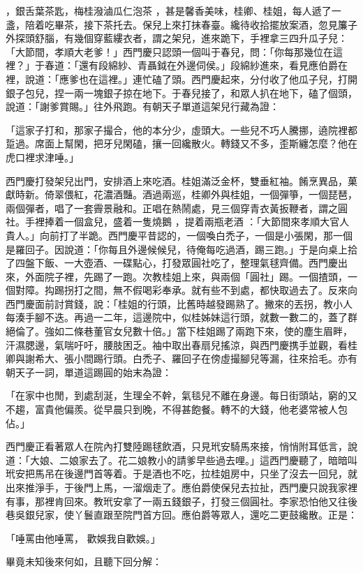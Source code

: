 \begin{showcontents}{}
，銀舌葉茶匙，梅桂潑滷瓜仁泡茶 ，甚是馨香美味，桂卿、桂姐，每人遞了一盞，陪着吃畢茶，接下茶托去。保兒上來打抹春臺。纔待收拾擺放案酒，忽見簾子外探頭舒腦，有幾個穿藍縷衣者，謂之架兒，進來跪下，手裡拿三四升瓜子兒：「大節間，孝順大老爹！」西門慶只認頭一個叫于春兒，問：「你每那幾位在這裡？」于春道：「還有段綿紗、青聶鉞在外邊伺侯。」段綿紗進來，看見應伯爵在裡，說道：「應爹也在這裡。」連忙磕了頭。西門慶起來，分付收了他瓜子兒，打開銀子包兒，捏一兩一塊銀子掠在地下。于春兒接了，和眾人扒在地下，磕了個頭，說道：「謝爹賞賜。」往外飛跑。有朝天子單道這架兒行藏為證：

「這家子打和，那家子撮合，他的本分少，虛頭大。一些兒不巧人騰挪，遶院裡都踅過。席面上幫閑，把牙兒閑磕，攘一回纔散火。轉錢又不多，歪斯纏怎麼？他在虎口裡求津唾。」

西門慶打發架兒出門，安排酒上來吃酒。桂姐滿泛金杯，雙垂紅袖。餚烹異品，菓獻時新。倚翠偎紅，花濃酒豔。酒過兩巡，桂卿外與桂姐，一個彈箏，一個琵琶，兩個彈者，唱了一套霽景融和。正唱在熱鬧處，見三個穿青衣黃扳鞭者，謂之圓社。手裡捧着一個盒兒，盛着一隻燒鵝 ，提着兩瓶老酒 ：「大節間來孝順大官人貴人。」向前打了半跪。西門慶平昔認的，一個喚白禿子，一個是小張閑，那一個是羅回子。因說道：「你每且外邊候候兒，待俺每吃過酒，踢三跑。」于是向桌上拾了四盤下飯、一大壺酒、一碟點心，打發眾圓社吃了，整理氣毬齊備。西門慶出來，外面院子裡，先踢了一跑。次教桂姐上來，與兩個「圓社」踢。一個揸頭，一個對障。抅踢拐打之間，無不假喝彩奉承。就有些不到處，都快取過去了。反來向西門慶面前討賞錢，說：「桂姐的行頭，比舊時越發踢熟了。撇來的丟拐，教小人每湊手腳不迭。再過一二年，這邊院中，似桂姊妹這行頭，就數一數二的，蓋了群絕倫了。強如二條巷董官女兒數十倍。」當下桂姐踢了兩跑下來，使的塵生眉畔，汗濕腮邊，氣喘吁吁，腰肢困乏。袖中取出春扇兒搖涼，與西門慶携手並觀，看桂卿與謝希大、張小間踢行頭。白禿子、羅回子在傍虛撮腳兒等漏，往來拾毛。亦有朝天子一詞，單道這踢圓的始末為證：

「在家中也閒，到處刮涎，生理全不幹，氣毯兒不離在身邊。每日街頭站，窮的又不趨，富貴他偏羨。從早晨只到晚，不得甚飽餐。轉不的大錢，他老婆常被人包佔。」

西門慶正看著眾人在院內打雙陸踢毬飲酒，只見玳安騎馬來接，悄悄附耳低言，說道：「大娘、二娘家去了。花二娘教小的請爹早些過去哩。」這西門慶聽了，暗暗叫玳安把馬吊在後邊門首等着。于是酒也不吃，拉桂姐房中，只坐了沒去一回兒，就出來推淨手，于後門上馬，一溜烟走了。應伯爵使保兒去拉扯，西門慶只說我家裡有事，那裡肯回來。教玳安拿了一兩五錢銀子，打發三個圓社。李家恐怕他又往後巷吳銀兒家，使丫鬟直跟至院門首方回。應伯爵等眾人，還吃二更鼓纔散。正是：

「唾罵由他唾罵，  歡娛我自歡娛。」

畢竟未知後來何如，且聽下回分解：





\end{showcontents}
